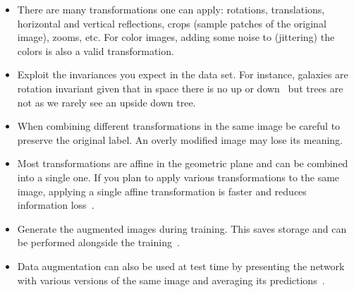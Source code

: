 \begin{itemize}
	\item There are many transformations one can apply: rotations, translations, horizontal and vertical reflections, crops (sample patches of the original image), zooms, etc. For color images, adding some noise to (jittering) the colors is also a valid transformation.

	\item Exploit the invariances you expect in the data set. For instance, galaxies are rotation invariant given that in space there is no up or down~\cite{Dieleman2015} but trees are not as we rarely see an upside down tree.

	\item When combining different transformations in the same image be careful to preserve the original label. An overly modified image may lose its meaning. 

	\item Most transformations are affine in the geometric plane and can be combined into a single one. If you plan to apply various transformations to the same image, applying a single affine transformation is faster and reduces information loss~\cite{Dieleman2015}.

	\item Generate the augmented images during training. This saves storage and can be performed alongside the training~\cite{Krizhevsky2012}.

	\item Data augmentation can also be used at test time by presenting the network with various versions of the same image and averaging its predictions~\cite{Krizhevsky2012}.
\end{itemize}

